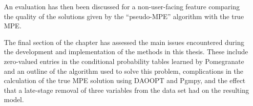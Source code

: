 An evaluation has then been discussed for a non-user-facing feature comparing the quality of the solutions given by the \enquote{pseudo-MPE} algorithm with the true MPE.

The final section of the chapter has assessed the main issues encountered during the development and implementation of the methods in this thesis.
These include zero-valued entries in the conditional probability tables learned by Pomegranate and  an outline of the algorithm used to solve this problem, complications in the calculation of the true MPE solution using DAOOPT and Pgmpy, and the effect that a late-stage removal of three variables from the data set had on the resulting model.